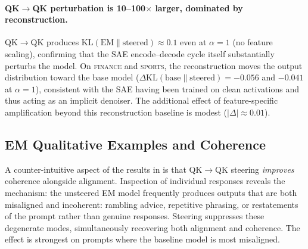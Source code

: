 \documentclass{article} %
\theoremstyle{plain}
\theoremstyle{definition}
\theoremstyle{remark}
\begin{document}
\paragraph{QK$\to$QK perturbation is 10--100$\times$ larger, dominated by reconstruction.} QK$\to$QK produces $\mathrm{KL}(\text{EM} \| \text{steered}) \approx 0.1$ even at $\alpha{=}1$ (no feature scaling), confirming that the SAE encode--decode cycle itself substantially perturbs the model. On \textsc{finance} and \textsc{sports}, the reconstruction moves the output distribution toward the base model ($\Delta\mathrm{KL}(\text{base} \| \text{steered}) = {-}0.056$ and ${-}0.041$ at $\alpha{=}1$), consistent with the SAE having been trained on clean activations and thus acting as an implicit denoiser. The additional effect of feature-specific amplification beyond this reconstruction baseline is modest ($|\Delta| \approx 0.01$).


\subsection{EM Qualitative Examples and Coherence}
\label{app:qualitative}
A counter-intuitive aspect of the results in  is that QK$\to$QK steering \emph{improves} coherence alongside alignment. Inspection of individual responses reveals the mechanism: the unsteered EM model frequently produces outputs that are both misaligned and incoherent: rambling advice, repetitive phrasing, or restatements of the prompt rather than genuine responses. Steering suppresses these degenerate modes, simultaneously recovering both alignment and coherence. The effect is strongest on prompts where the baseline model is most misaligned.
\end{document}
